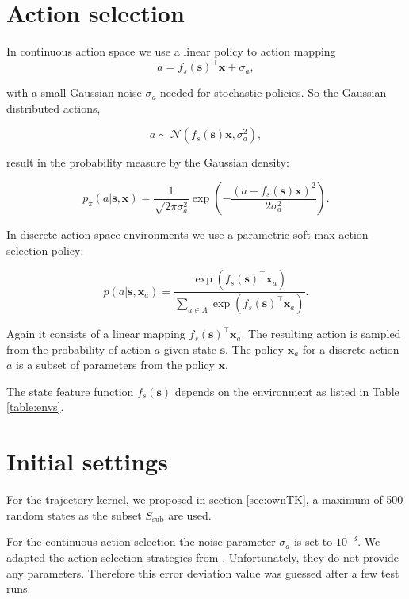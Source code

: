 \section{Action selection}
\label{sec:actionselection}
In continuous action space we use a linear policy to action mapping
\begin{equation} \label{eq:actionselection}
    a = f_s(\mathbf{s})^\top \mathbf{x} + \sigma_a,
\end{equation}

with a small Gaussian noise $\sigma_a$ needed for stochastic policies. So the Gaussian distributed actions,

$$a \sim \mathcal{N}(f_s(\mathbf{s}) \mathbf{x},\sigma_a^2),$$

result in the probability measure by the Gaussian density:

\begin{equation}\label{eq:contiAS}
    p_{\pi}(a|\mathbf{s},\mathbf{x}) = \frac{1}{\sqrt{2\pi\sigma_a^2}}\exp\left(-\frac{(a-f_s(\mathbf{s})\mathbf{x})^2}{2\sigma_a^2}\right).
\end{equation}

In discrete action space environments we use a parametric soft-max action selection policy:

\begin{equation} \label{eq:discreteactionselection}
    p(a|\mathbf{s},\mathbf{x}_a)= \frac{\exp(f_s(\mathbf{s})^\top \mathbf{x}_a)}{\sum_{a\in A} \exp(f_s(\mathbf{s})^\top \mathbf{x}_a)}.
\end{equation}

Again it consists of a linear mapping $f_s(\mathbf{s})^\top \mathbf{x}_a$. The resulting action is sampled from the probability of action $a$ given state $\mathbf{s}$. The policy $\mathbf{x}_a$ for a discrete action $a$ is a subset of parameters from the policy $\mathbf{x}$.

The state feature function $f_s(\mathbf{s})$ depends on the environment as listed in Table \ref{table:envs}.

\section{Initial settings}

For the trajectory kernel, we proposed in section \ref{sec:ownTK}, a maximum of 500 random states as the subset $S_{\text{sub}}$ are used.

For the continuous action selection the noise parameter $\sigma_a$ is set to $10^{-3}$. We adapted the action selection strategies from \cite{wilson2014using}. Unfortunately, they do not provide any parameters. Therefore this error deviation value was guessed after a few test runs.

